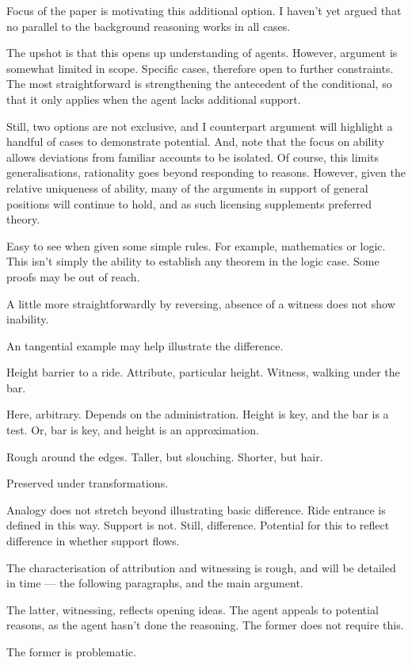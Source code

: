 \documentclass[10pt]{article}
\begin{document}
\begin{note}
  Focus of the paper is motivating this additional option.
  I haven't yet argued that no parallel to the background reasoning works in all cases.

  The upshot is that this opens up understanding of agents.
  However, argument is somewhat limited in scope.
  Specific cases, therefore open to further constraints.
  The most straightforward is strengthening the antecedent of the conditional, so that it only applies when the agent lacks additional support.

  Still, two options are not exclusive, and I counterpart argument will highlight a handful of cases to demonstrate potential.
  And, note that the focus on ability allows deviations from familiar accounts to be isolated.
  Of course, this limits generalisations, rationality goes beyond responding to reasons.
  However, given the relative uniqueness of ability, many of the arguments in support of general positions will continue to hold, and as such licensing supplements preferred theory.
\end{note}



\begin{note}
  Easy to see when given some simple rules.
  For example, mathematics or logic.
  This isn't simply the ability to establish any theorem in the logic case.
  Some proofs may be out of reach.

  A little more straightforwardly by reversing, absence of a witness does not show inability.
\end{note}

\begin{note}
  An tangential example may help illustrate the difference.

  Height barrier to a ride.
  Attribute, particular height.
  Witness, walking under the bar.

  Here, arbitrary.
  Depends on the administration.
  Height is key, and the bar is a test.
  Or, bar is key, and height is an approximation.

  Rough around the edges.
  Taller, but slouching.
  Shorter, but hair.

  Preserved under transformations.
\end{note}

\begin{note}
  Analogy does not stretch beyond illustrating basic difference.
  Ride entrance is defined in this way.
  Support is not.
  Still, difference.
  Potential for this to reflect difference in whether support flows.

  The characterisation of attribution and witnessing is rough, and will be detailed in time --- the following paragraphs, and the main argument.

  The latter, witnessing, reflects opening ideas.
  The agent appeals to potential reasons, as the agent hasn't done the reasoning.
  The former does not require this.

  The former is problematic.
\end{note}
\end{document}
